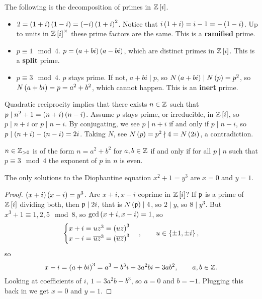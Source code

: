 The following is the decomposition of primes in $ \Z\sbr{i} $.
\begin{itemize}
\item $ 2 = \br{1 + i}\br{1 - i} = \br{-i}\br{1 + i}^2 $. Notice that $ i\br{1 + i} = i - 1 = -\br{1 - i} $. Up to units in $ \Z\sbr{i}^\times $ these prime factors are the same. This is a \textbf{ramified} prime.
\item $ p \equiv 1 \mod 4 $. $ p = \br{a + bi}\br{a - bi} $, which are distinct primes in $ \Z\sbr{i} $. This is a \textbf{split} prime.
\item $ p \equiv 3 \mod 4 $. $ p $ stays prime. If not, $ a + bi \mid p $, so $ N\br{a + bi} \mid N\br{p} = p^2 $, so $ N\br{a + bi} = p = a^2 + b^2 $, which cannot happen. This is an \textbf{inert} prime.
\end{itemize}


Quadratic reciprocity implies that there exists $ n \in \mathbb{Z} $ such that $ p \mid n^2 + 1 = \br{n + i}\br{n - i} $. Assume $ p $ stays prime, or irreducible, in $ \Z\sbr{i} $, so $ p \mid n + i $ or $ p \mid n - i $. By conjugating, we see $ p \mid n + i $ if and only if $ p \mid n - i $, so $ p \mid \br{n + i} - \br{n - i} = 2i $. Taking $ N $, see $ N\br{p} = p^2 \nmid 4 = N\br{2i} $, a contradiction.

\begin{theorem}
$ n \in \mathbb{Z}_{> 0} $ is of the form $ n = a^2 + b^2 $ for $ a, b \in \mathbb{Z} $ if and only if for all $ p \mid n $ such that $ p \equiv 3 \mod 4 $ the exponent of $ p $ in $ n $ is even.
\end{theorem}

\begin{theorem}
The only solutions to the Diophantine equation $ x^2 + 1 = y^3 $ are $ x = 0 $ and $ y = 1 $.
\end{theorem}

\begin{proof}
$ \br{x + i}\br{x - i} = y^3 $. Are $ x + i, x - i $ coprime in $ \Z\sbr{i} $? If $ \mathfrak{p} $ is a prime of $ \Z\sbr{i} $ dividing both, then $ \mathfrak{p} \mid 2i $, that is $ N\br{\pp} \mid 4 $, so $ 2 \mid y $, so $ 8 \mid y^3 $. But $ x^3 + 1 \equiv 1, 2, 5 \mod 8 $, so $ \gcd\br{x + i, x - i} = 1 $, so
$$
\begin{cases}
x + i = uz^3 = \br{uz}^3 \\
x - i = \overline{u}\overline{z}^3 = \br{\overline{u}\overline{z}}^3
\end{cases},
\qquad
u \in \cbr{\pm 1, \pm i},
$$
so
$$ x - i = \br{a + bi}^3 = a^3 - b^3i + 3a^2bi - 3ab^2, \qquad a, b \in \Z. $$
Looking at coefficients of $ i $, $ 1 = 3a^2b - b^3 $, so $ a = 0 $ and $ b = -1 $. Plugging this back in we get $ x = 0 $ and $ y = 1 $.
\end{proof}

